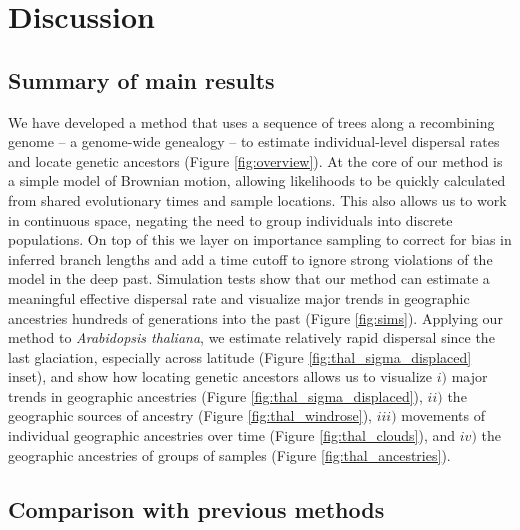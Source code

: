 \documentclass[12pt]{article}
\begin{document}
\section*{Discussion}

\subsection*{Summary of main results}

We have developed a method that uses a sequence of trees along a recombining genome -- a genome-wide genealogy -- to estimate individual-level dispersal rates and locate genetic ancestors (Figure \ref{fig:overview}). 
At the core of our method is a simple model of Brownian motion, allowing likelihoods to be quickly calculated from shared evolutionary times and sample locations.
This also allows us to work in continuous space, negating the need to group individuals into discrete populations.
On top of this we layer on importance sampling to correct for bias in inferred branch lengths and add a time cutoff to ignore strong violations of the model in the deep past. 
Simulation tests show that our method can estimate a meaningful effective dispersal rate and visualize major trends in geographic ancestries hundreds of generations into the past (Figure \ref{fig:sims}).
Applying our method to \textit{Arabidopsis thaliana}, we estimate relatively rapid dispersal since the last glaciation, especially across latitude (Figure \ref{fig:thal_sigma_displaced} inset), and show how locating genetic ancestors allows us to visualize $i)$ major trends in geographic ancestries (Figure \ref{fig:thal_sigma_displaced}), $ii)$ the geographic sources of ancestry (Figure \ref{fig:thal_windrose}), $iii)$ movements of individual geographic ancestries over time (Figure \ref{fig:thal_clouds}), and $iv)$ the geographic ancestries of groups of samples (Figure \ref{fig:thal_ancestries}).

\subsection*{Comparison with previous methods}
\end{document}
